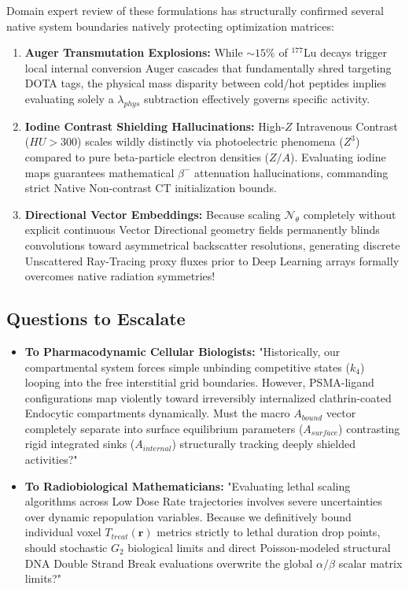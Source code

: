 \documentclass[11pt,a4paper]{article}
\begin{document}
Domain expert review of these formulations has structurally confirmed several native system boundaries natively protecting optimization matrices:
\begin{enumerate}
    \item \textbf{Auger Transmutation Explosions:} While $\sim 15\%$ of $^{177}$Lu decays trigger local internal conversion Auger cascades that fundamentally shred targeting DOTA tags, the physical mass disparity between cold/hot peptides implies evaluating solely a $\lambda_{phys}$ subtraction effectively governs specific activity.
    \item \textbf{Iodine Contrast Shielding Hallucinations:} High-$Z$ Intravenous Contrast ($HU > 300$) scales wildly distinctly via photoelectric phenomena ($Z^3$) compared to pure beta-particle electron densities ($Z/A$). Evaluating iodine maps guarantees mathematical $\beta^-$ attenuation hallucinations, commanding strict Native Non-contrast CT initialization bounds.
    \item \textbf{Directional Vector Embeddings:} Because scaling $\mathcal{N}_\theta$ completely without explicit continuous Vector Directional geometry fields permanently blinds convolutions toward asymmetrical backscatter resolutions, generating discrete Unscattered Ray-Tracing proxy fluxes prior to Deep Learning arrays formally overcomes native radiation symmetries!
\end{enumerate}

\subsection{Questions to Escalate}
\begin{itemize}
    \item \textbf{To Pharmacodynamic Cellular Biologists:} "Historically, our compartmental system forces simple unbinding competitive states ($k_4$) looping into the free interstitial grid boundaries. However, PSMA-ligand configurations map violently toward irreversibly internalized clathrin-coated Endocytic compartments dynamically. Must the macro $A_{bound}$ vector completely separate into surface equilibrium parameters ($A_{surface}$) contrasting rigid integrated sinks ($A_{internal}$) structurally tracking deeply shielded activities?"
    \item \textbf{To Radiobiological Mathematicians:} "Evaluating lethal scaling algorithms across Low Dose Rate trajectories involves severe uncertainties over dynamic repopulation variables. Because we definitively bound individual voxel $T_{treat}(\mathbf{r})$ metrics strictly to lethal duration drop points, should stochastic $G_2$ biological limits and direct Poisson-modeled structural DNA Double Strand Break evaluations overwrite the global $\alpha / \beta$ scalar matrix limits?"
\end{itemize}
\end{document}
